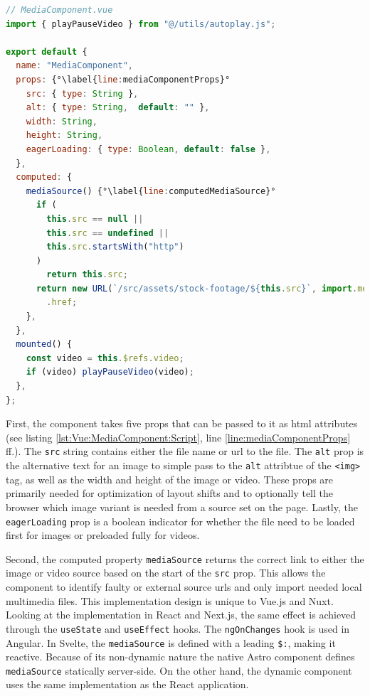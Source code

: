 \documentclass[a4paper, 10pt]{article}
\begin{document}
\begin{lstlisting}[caption=MediaComponent in Vue.js (Script), label={lst:Vue:MediaComponent:Script}, language=JavaScript, firstnumber=13, escapechar=°]
// MediaComponent.vue
import { playPauseVideo } from "@/utils/autoplay.js";

export default {
  name: "MediaComponent",
  props: {°\label{line:mediaComponentProps}°
    src: { type: String },
    alt: { type: String,  default: "" },
    width: String,
    height: String,
    eagerLoading: { type: Boolean, default: false },
  },
  computed: {
    mediaSource() {°\label{line:computedMediaSource}°
      if (
        this.src == null ||
        this.src == undefined ||
        this.src.startsWith("http")
      )
        return this.src;
      return new URL(`/src/assets/stock-footage/${this.src}`, import.meta.url)
        .href;
    },
  },
  mounted() {
    const video = this.$refs.video;
    if (video) playPauseVideo(video);
  },
};
\end{lstlisting}

First, the component takes five props that can be passed to it as \acrshort{html} attributes (see listing \ref{lst:Vue:MediaComponent:Script}, line \ref{line:mediaComponentProps} ff.).
The \verb|src| string contains either the file name or \acrshort{url} to the file.
The \verb|alt| prop is the alternative text for an image to simple pass to the \verb|alt| attribtue of the \verb|<img>| tag, as well as the width and height of the image or video.
These props are primarily needed for optimization of layout shifts and to optionally tell the browser which image variant is needed from a source set on the page.
Lastly, the \verb|eagerLoading| prop is a boolean indicator for whether the file need to be loaded first for images or preloaded fully for videos.

Second, the computed property \verb|mediaSource| returns the correct link to either the image or video source based on the start of the \verb|src| prop.
This allows the component to identify faulty or external source \acrshort{url}s and only import needed local multimedia files.
This implementation design is unique to Vue.js and Nuxt.
Looking at the implementation in React and Next.js, the same effect is achieved through the \verb|useState| and \verb|useEffect| hooks.
The \verb|ngOnChanges| hook is used in Angular.
In Svelte, the \verb|mediaSource| is defined with a leading \verb|$:|, making it reactive. Because of its non-dynamic nature the native Astro component defines \verb|mediaSource| statically server-side.
On the other hand, the dynamic component uses the same implementation as the React application.
\end{document}
